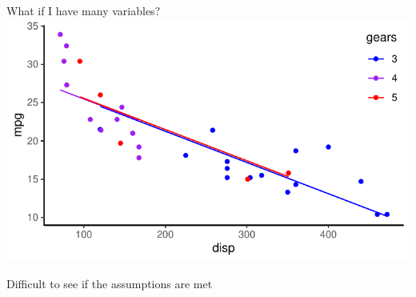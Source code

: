 \documentclass[
  ignorenonframetext,
  aspectratio=169]{beamer}
\begin{document}
\begin{frame}{What if I have many variables?}
\protect\hypertarget{what-if-i-have-many-variables}{}
\includegraphics{03-Lecture_files/figure-beamer/unnamed-chunk-25-1.pdf}

Difficult to see if the assumptions are met
\end{frame}
\end{document}
